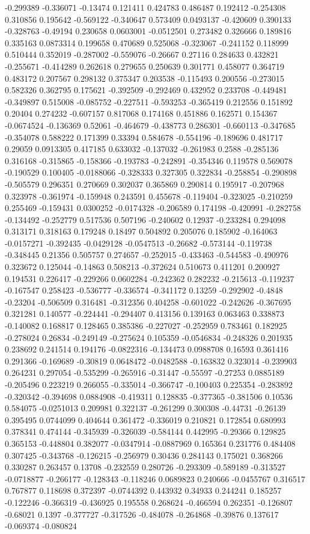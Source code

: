 -0.299389 -0.336071 -0.13474 0.121411 0.424783 0.486487 0.192412 -0.254308 0.310856 0.195642 -0.569122 -0.340647 0.573409 0.0493137 -0.420609 0.390133 -0.328763 -0.49194 0.230658 0.0603001 -0.0512501 0.273482 0.326666 0.189816 0.335163 0.0873314 0.199658 0.470689 0.525068 -0.323067 -0.241152 0.118999 0.510444 0.352019 -0.287002 -0.559076 -0.26667 0.27116 0.284633 0.432821 -0.255671 -0.414289 0.262618 0.279655 0.250639 0.301771 0.458077 0.364719 0.483172 0.207567 0.298132 0.375347 0.203538 -0.115493 0.200556 -0.273015 0.582326 0.362795 0.175621 -0.392509 -0.292469 0.432952 0.233708 -0.449481 -0.349897 0.515008 -0.085752 -0.227511 -0.593253 -0.365419 0.212556 0.151892 0.20404 0.274232 -0.607157 0.817068 0.174168 0.451886 0.162571 0.154367 -0.0674524 -0.136369 0.52061 -0.464679 -0.438773 0.286301 -0.660113 -0.347685 -0.354078 0.588222 0.171399 0.33394 0.584678 -0.554196 -0.189696 0.481717 0.29059 0.0913305 0.417185 0.633032 -0.137032 -0.261983 0.2588 -0.285136 0.316168 -0.315865 -0.158366 -0.193783 -0.242891 -0.354346 0.119578 0.569078 -0.190529 0.100405 -0.0188066 -0.328333 0.327305 0.322834 -0.258854 -0.290898 -0.505579 0.296351 0.270669 0.302037 0.365869 0.290814 0.195917 -0.207968 0.323978 -0.361974 -0.159948 0.243591 0.455678 -0.119404 -0.323025 -0.210259 0.255469 -0.159431 0.0300252 -0.0174328 -0.206589 0.174198 -0.420991 -0.282758 -0.134492 -0.252779 0.517536 0.507196 -0.240602 0.12937 -0.233284 0.294098 0.313171 0.318163 0.179248 0.18497 0.504892 0.205076 0.185902 -0.164063 -0.0157271 -0.392435 -0.0429128 -0.0547513 -0.26682 -0.573144 -0.119738 -0.348445 0.21356 0.505757 0.274657 -0.252015 -0.433463 -0.544583 -0.490976 0.323672 0.125044 -0.14863 0.508213 -0.372624 0.510673 0.411201 0.200927 0.194531 0.226417 -0.229266 0.0602284 -0.242362 0.282232 -0.215613 -0.119237 -0.167547 0.258423 -0.536777 -0.336574 -0.341172 0.13259 -0.292902 -0.4848 -0.23204 -0.506509 0.316481 -0.312356 0.404258 -0.601022 -0.242626 -0.367695 0.321281 0.140577 -0.224441 -0.294407 0.413156 0.139163 0.063463 0.338873 -0.140082 0.168817 0.128465 0.385386 -0.227027 -0.252959 0.783461 0.182925 -0.278024 0.26834 -0.249149 -0.275624 0.105359 -0.0546834 -0.248326 0.201935 0.238692 0.241514 0.194176 -0.0822316 -0.134473 0.0988708 0.16593 0.361416 0.291366 -0.169689 -0.30819 0.0648472 -0.0482588 -0.163832 0.323014 -0.239903 0.264231 0.297054 -0.535299 -0.265916 -0.31447 -0.55597 -0.27253 0.0885189 -0.205496 0.223219 0.266055 -0.335014 -0.366747 -0.100403 0.225354 -0.283892 -0.320342 -0.394698 0.0884908 -0.419311 0.128835 -0.377365 -0.381506 0.10536 0.584075 -0.0251013 0.209981 0.322137 -0.261299 0.300308 -0.44731 -0.26139 0.395495 0.0744099 0.404644 0.361472 -0.336019 0.210821 0.172854 0.680993 0.378341 0.474144 -0.345939 -0.326039 -0.584144 0.442995 -0.29366 0.129825 0.365153 -0.448804 0.382077 -0.0347914 -0.0887969 0.165364 0.231776 0.484408 0.307425 -0.343768 -0.126215 -0.256979 0.30436 0.284143 0.175021 0.368266 0.330287 0.263457 0.13708 -0.232559 0.280726 -0.293309 -0.589189 -0.313527 -0.0718877 -0.266177 -0.128343 -0.118246 0.0689823 0.240666 -0.0455767 0.316517 0.767877 0.118698 0.372397 -0.0744392 0.443932 0.34933 0.244241 0.185257 -0.122246 -0.366319 -0.436925 0.195558 0.268624 -0.466594 0.262351 -0.126807 -0.68021 0.1397 -0.377727 -0.317526 -0.484078 -0.264868 -0.39876 0.137617 -0.069374 -0.080824 